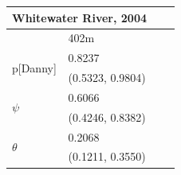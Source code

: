 \documentclass[12pt]{article}
\begin{document}
\begin{table}
    \begin{center}
    \begin{tabular}{|l|l|l|l|}
        \hline
        \multicolumn{2}{|l|}{\textbf{Whitewater River, 2004}} \\
        \hline
            & 402m \\
        \hline
        \multirow{2}{*}{p[Danny]}
            & 0.8237 \\
            & (0.5323, 0.9804) \\
        \hline
        \multirow{2}{*}{\(\psi\)}
            & 0.6066 \\
            & (0.4246, 0.8382) \\
        \hline
        \multirow{2}{*}{\(\theta\)}
            & 0.2068 \\
            & (0.1211, 0.3550) \\
        \hline
    \end{tabular}
    \end{center}
    \end{table}
\end{document}
